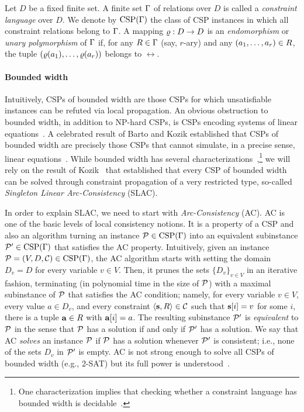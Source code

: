 \documentclass[11pt,letter]{article}
\begin{document}
Let $D$ be a fixed finite set. A finite set $\Gamma$ of relations over $D$ is
called a \emph{constraint language} over $D$. We denote by ${\rm CSP}(\Gamma)$ the
class of CSP instances in which all constraint relations belong to $\Gamma$. A mapping $\varrho:D\to D$ is an \emph{endomorphism} or \emph{unary polymorphism} of $\Gamma$ if, for any $R\in\Gamma$ (say, $r$-ary) and any $(a _1,\ldots, a _{r})\in R$, the tuple $(\varrho(a_1),\ldots,\varrho(a_r))$ belongs to $\rel$.

\paragraph{Bounded width}

Intuitively, CSPs of bounded width are those CSPs  for which unsatisfiable
instances can be refuted via local propagation. An obvious obstruction to bounded width, in
addition to NP-hard CSPs, is CSPs encoding systems of linear
equations~\cite{Feder98:monotone}. A celebrated result of Barto and Kozik
established that CSPs of bounded width are precisely those CSPs that cannot
simulate, in a precise sense, linear equations~\cite{Barto14:local}. 
While bounded width has several
characterizations~\cite{LaroseZadori07:au,Maroti2008existence,Bulatov09:width,Barto14:local,Kozik15:au},\footnote{One characterization implies that checking whether a constraint language has bounded
width is decidable~\cite{Kozik15:au}.} we will rely on the result of
Kozik~\cite{Kozik21:sicomp} that established that every CSP of bounded width can
be solved through constraint propagation of a very restricted type, so-called
\emph{Singleton Linear Arc-Consistency} (SLAC). 

In order to explain SLAC, we need to start with
\emph{Arc-Consistency} (AC). AC is one of the basic levels of local consistency
notions. It is a property of a CSP and also an algorithm
turning an instance ${\mathcal P}\in{\rm CSP}(\Gamma)$ into an equivalent subinstance
${\mathcal P}'\in{\rm CSP}(\Gamma)$ that satisfies the AC property. Intuitively, given an instance ${\mathcal P}=(V,D,{\mathcal C})\in{\rm CSP}(\Gamma)$,
the AC algorithm starts with setting the domain $D_v=D$ for every variable $v\in
V$. Then, it prunes the sets $\{D_v\}_{v\in V}$ in an iterative fashion,
terminating (in polynomial time in the size of ${\mathcal P}$) with a maximal subinstance
of ${\mathcal P}$ that satisfies the AC condition; namely, for every variable $v\in V$, every value $a\in
D_v$, and every constraint $\langle {\bf s},R \rangle\in{\mathcal C}$ such that ${\bf s}[i]=v$ for some $i$, there is a tuple ${\bf a}\in R$ with
${\bf a}[i]=a$. 
The resulting subinstance ${\mathcal P}'$ is \emph{equivalent} to ${\mathcal P}$
in the sense that ${\mathcal P}$ has a solution if and only if ${\mathcal P}'$ has a solution. We
say that AC \emph{solves} an instance ${\mathcal P}$ if ${\mathcal P}$ has a solution whenever
${\mathcal P}'$ is consistent; i.e., none of the sets $D_v$ in ${\mathcal P}'$ is empty.
AC is not strong enough to solve all CSPs of bounded width (e.g., \textsc{2-SAT}) but its
full power is understood~\cite{Feder98:monotone,Dalmau99}.
\end{document}

